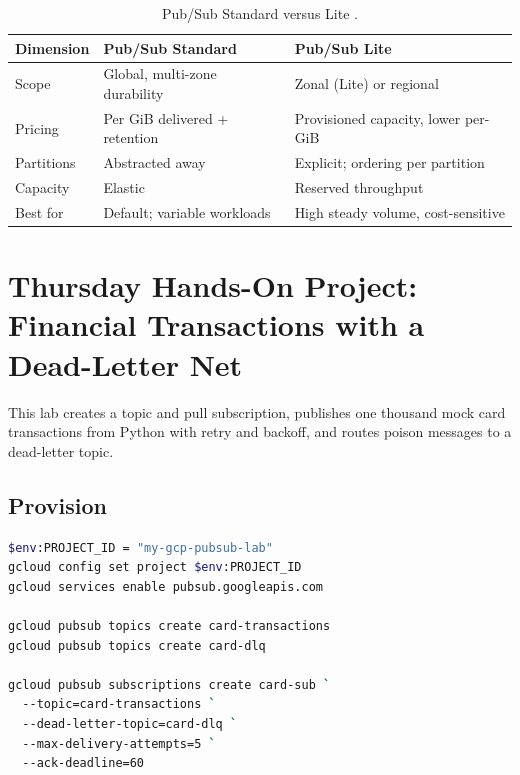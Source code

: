 \begin{table}[H]
\centering
\small
\begin{tabular}{@{}p{3.6cm}p{4.4cm}p{4.4cm}@{}} \\
\toprule
\textbf{Dimension} & \textbf{Pub/Sub Standard} & \textbf{Pub/Sub Lite} \\
\midrule
Scope & Global, multi-zone durability & Zonal (Lite) or regional \\
Pricing & Per GiB delivered + retention & Provisioned capacity, lower per-GiB \\
Partitions & Abstracted away & Explicit; ordering per partition \\
Capacity & Elastic & Reserved throughput \\
Best for & Default; variable workloads & High steady volume, cost-sensitive \\
\bottomrule
\end{tabular}
\caption{Pub/Sub Standard versus Lite \cite{googlecloudpubsubdocs}.}
\label{tab:ch13-lite-vs-standard}
\end{table}

\section{Thursday Hands-On Project: Financial Transactions with a Dead-Letter Net}
This lab creates a topic and pull subscription, publishes one thousand mock card transactions from Python with retry and backoff, and routes poison messages to a dead-letter topic.

\subsection{Provision}
\begin{lstlisting}[language=bash,caption={Creating topic, DLQ, and subscription with delivery guardrails.}]
$env:PROJECT_ID = "my-gcp-pubsub-lab"
gcloud config set project $env:PROJECT_ID
gcloud services enable pubsub.googleapis.com

gcloud pubsub topics create card-transactions
gcloud pubsub topics create card-dlq

gcloud pubsub subscriptions create card-sub `
  --topic=card-transactions `
  --dead-letter-topic=card-dlq `
  --max-delivery-attempts=5 `
  --ack-deadline=60
\end{lstlisting}

